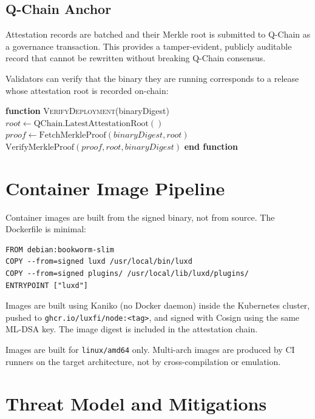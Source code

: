 \documentclass[11pt]{article}
\begin{document}
\subsection{Q-Chain Anchor}

Attestation records are batched and their Merkle root is submitted to Q-Chain as a governance transaction. This provides a tamper-evident, publicly auditable record that cannot be rewritten without breaking Q-Chain consensus.

Validators can verify that the binary they are running corresponds to a release whose attestation root is recorded on-chain:

\begin{algorithmic}[1]
\State \textbf{function} \textsc{VerifyDeployment}(binaryDigest)
\State $root \gets \text{QChain.LatestAttestationRoot}()$
\State $proof \gets \text{FetchMerkleProof}(binaryDigest, root)$
\State \Return $\text{VerifyMerkleProof}(proof, root, binaryDigest)$
\State \textbf{end function}
\end{algorithmic}

\section{Container Image Pipeline}

Container images are built from the signed binary, not from source. The Dockerfile is minimal:

\begin{verbatim}
FROM debian:bookworm-slim
COPY --from=signed luxd /usr/local/bin/luxd
COPY --from=signed plugins/ /usr/local/lib/luxd/plugins/
ENTRYPOINT ["luxd"]
\end{verbatim}

Images are built using Kaniko (no Docker daemon) inside the Kubernetes cluster, pushed to \texttt{ghcr.io/luxfi/node:<tag>}, and signed with Cosign using the same ML-DSA key. The image digest is included in the attestation chain.

Images are built for \texttt{linux/amd64} only. Multi-arch images are produced by CI runners on the target architecture, not by cross-compilation or emulation.

\section{Threat Model and Mitigations}
\end{document}
